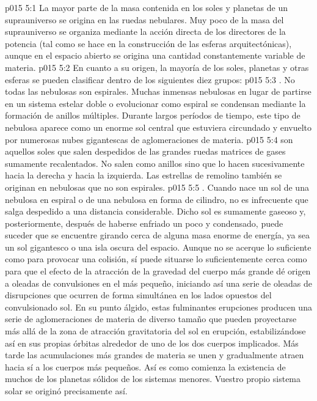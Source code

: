 \vs p015 5:1 La mayor parte de la masa contenida en los soles y planetas de un suprauniverso se origina en las ruedas nebulares. Muy poco de la masa del suprauniverso se organiza mediante la acción directa de los directores de la potencia (tal como se hace en la construcción de las esferas arquitectónicas), aunque en el espacio abierto se origina una cantidad constantemente variable de materia.
\vs p015 5:2 En cuanto a su origen, la mayoría de los soles, planetas y otras esferas se pueden clasificar dentro de los siguientes diez grupos:
\vs p015 5:3 . No todas las nebulosas son espirales. Muchas inmensas nebulosas en lugar de partirse en un sistema estelar doble o evolucionar como espiral se condensan mediante la formación de anillos múltiples. Durante largos períodos de tiempo, este tipo de nebulosa aparece como un enorme sol central que estuviera circundado y envuelto por numerosas nubes gigantescas de aglomeraciones de materia.
\vs p015 5:4  son aquellos soles que salen despedidos de las grandes ruedas matrices de gases sumamente recalentados. No salen como anillos sino que lo hacen sucesivamente hacia la derecha y hacia la izquierda. Las estrellas de remolino también se originan en nebulosas que no son espirales.
\vs p015 5:5 . Cuando nace un sol de una nebulosa en espiral o de una nebulosa en forma de cilindro, no es infrecuente que salga despedido a una distancia considerable. Dicho sol es sumamente gaseoso y, posteriormente, después de haberse enfriado un poco y condensado, puede suceder que se encuentre girando cerca de alguna masa enorme de energía, ya sea un sol gigantesco o una isla oscura del espacio. Aunque no se acerque lo suficiente como para provocar una colisión, sí puede situarse lo suficientemente cerca como para que el efecto de la atracción de la gravedad del cuerpo más grande dé origen a oleadas de convulsiones en el más pequeño, iniciando así una serie de oleadas de disrupciones que ocurren de forma simultánea en los lados opuestos del convulsionado sol. En su punto álgido, estas fulminantes erupciones producen una serie de aglomeraciones de materia de diverso tamaño que pueden proyectarse más allá de la zona de atracción gravitatoria del sol en erupción, estabilizándose así en sus propias órbitas alrededor de uno de los dos cuerpos implicados. Más tarde las acumulaciones más grandes de materia se unen y gradualmente atraen hacia sí a los cuerpos más pequeños. Así es como comienza la existencia de muchos de los planetas sólidos de los sistemas menores. Vuestro propio sistema solar se originó precisamente así.
